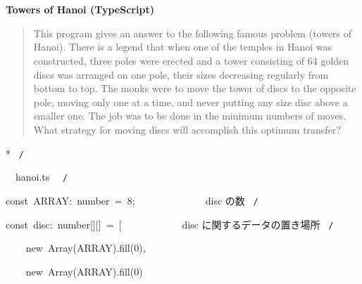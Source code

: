 \documentclass[a4paper,10pt]{article}
\def\mc{\relax}
\begin{document}
\tt\mc 

\noindent
\mbox{}\rm\mc {\tt /}{\tt *}\  \hrulefill *


\ %

\centerline{\bf Towers of Hanoi (TypeScript)}

\begin{quote}

This program gives an answer to the following famous problem (towers of
Hanoi).
There is a legend that when one of the temples in Hanoi was constructed,
three poles were erected and a tower consisting of 64 golden discs was
arranged on one pole, their sizes decreasing regularly from bottom to top.
The monks were to move the tower of discs to the opposite pole, moving
only one at a time, and never putting any size disc above a smaller one.
The job was to be done in the minimum numbers of moves. What strategy for
moving discs will accomplish this optimum transfer?
\end{quote}


* \hrulefill \rm\mc \ {\tt *}{\tt /}
\tt\mc 

\noindent
\mbox{}\hfill

\noindent
\mbox{}\hfill

\noindent
\mbox{}\rm\mc {\tt /}{\tt *}\  \hrulefill\ hanoi.ts \ \hrulefill \rm\mc \ {\tt *}{\tt /}
\tt\mc 

\noindent
\mbox{}\hfill

\noindent
\mbox{}\hfill

\noindent
\mbox{}const{\tt\mc \ }ARRAY:{\tt\mc \ }number{\tt\mc \ }={\tt\mc \ }8;{\tt\mc \ }{\tt\mc \ }{\tt\mc \ }{\tt\mc \ }{\tt\mc \ }{\tt\mc \ }{\tt\mc \ }{\tt\mc \ }{\tt\mc \ }{\tt\mc \ }{\tt\mc \ }{\tt\mc \ }\rm\mc {\tt /}{\tt *}\  \ disc の数 \hfill \rm\mc \ {\tt *}{\tt /}
\tt\mc 

\noindent
\mbox{}\hfill

\noindent
\mbox{}const{\tt\mc \ }disc:{\tt\mc \ }number[][]{\tt\mc \ }={\tt\mc \ }[{\tt\mc \ }{\tt\mc \ }{\tt\mc \ }{\tt\mc \ }{\tt\mc \ }{\tt\mc \ }{\tt\mc \ }{\tt\mc \ }{\tt\mc \ }{\tt\mc \ }\rm\mc {\tt /}{\tt *}\  \ disc に関するデータの置き場所 \hfill \rm\mc \ {\tt *}{\tt /}
\tt\mc 

\noindent
\mbox{}{\tt\mc \ }{\tt\mc \ }{\tt\mc \ }{\tt\mc \ }new{\tt\mc \ }Array(ARRAY).fill(0),

\noindent
\mbox{}{\tt\mc \ }{\tt\mc \ }{\tt\mc \ }{\tt\mc \ }new{\tt\mc \ }Array(ARRAY).fill(0)
\end{document}
